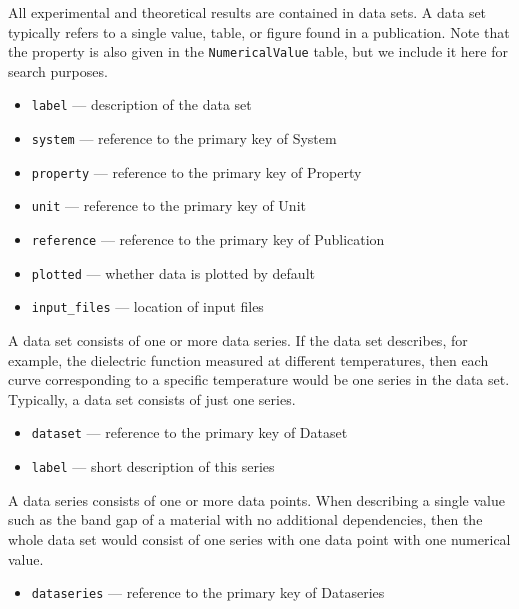 \documentclass{article}
\begin{document}
All experimental and theoretical results are contained in data sets. A data set typically refers to a single value, table, or figure found in a publication. Note that the property is also given in the \texttt{NumericalValue} table, but we include it here for search purposes.
\begin{tcolorbox}[colback=green!5,colframe=green!40!black,title=Dataset(Base)]
  \begin{itemize}
  \item \texttt{label} --- description of the data set
  \item \texttt{system} --- reference to the primary key of System
  \item \texttt{property} --- reference to the primary key of Property
  \item \texttt{unit} --- reference to the primary key of Unit
  \item \texttt{reference} --- reference to the primary key of Publication
  \item \texttt{plotted} --- whether data is plotted by default
  \item \texttt{input\_files} --- location of input files
  \end{itemize}
\end{tcolorbox}

A data set consists of one or more data series. If the data set describes, for example, the dielectric function measured at different temperatures, then each curve corresponding to a specific temperature would be one series in the data set. Typically, a data set consists of just one series.
\begin{tcolorbox}[colback=green!5,colframe=green!40!black,title=Dataseries(Base)]
  \begin{itemize}
  \item \texttt{dataset} --- reference to the primary key of Dataset
  \item \texttt{label} --- short description of this series
  \end{itemize}
\end{tcolorbox}

A data series consists of one or more data points. When describing a single value such as the band gap of a material with no additional dependencies, then the whole data set would consist of one series with one data point with one numerical value.
\begin{tcolorbox}[colback=green!5,colframe=green!40!black,title=Datapoint(Base)]
  \begin{itemize}
  \item \texttt{dataseries} --- reference to the primary key of Dataseries
  \end{itemize}
\end{tcolorbox}
\end{document}
